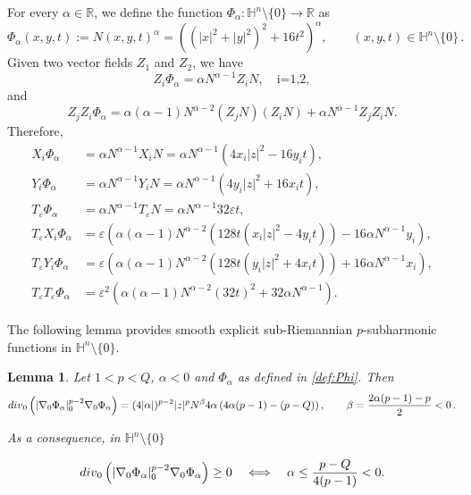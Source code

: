 \documentclass[10pt]{amsart}
\numberwithin{equation}{section}
\newtheorem{lemma}[theorem]{Lemma}
\theoremstyle{definition}
\newcommand{\R}{{\mathbb R}}
\newcommand{\eps}{\varepsilon}
\newcommand{\He}{\mathbb{H}}
\newcommand{\eT}{T_{\eps}}
\begin{document}
For every $\alpha \in \R$, we define the function $\Phi_{\alpha}:\He^n\setminus \{ 0\} \to \R$ as
\begin{equation}\label{def:Phi}
\Phi_{\alpha}(x,y,t):= N(x,y,t)^{\alpha} = \left((|x|^2 + |y|^2)^2 + 16t^2\right)^{\alpha}, \qquad (x,y,t) \in \He^n\setminus \{ 0\} \,.
\end{equation}
Given two vector fields $Z_1$ and $Z_2$, we have 
$$Z_i \Phi_{\alpha} = \alpha N^{\alpha -1} Z_i N, \quad \mbox{i=1,2},$$
\noindent and
$$Z_j Z_i \Phi_{\alpha} = \alpha (\alpha-1)N^{\alpha-2}(Z_j N)(Z_i N) + \alpha N^{\alpha-1}Z_j Z_i N.$$ 
Therefore,
\begin{align}
\label{XiPhi} X_i \Phi_{\alpha} &= \alpha N^{\alpha -1} X_i N = \alpha N^{\alpha-1} (4x_i |z|^2 - 16y_i t),\\
\label{YiPhi} Y_i \Phi_{\alpha} &= \alpha N^{\alpha -1} Y_i N = \alpha N^{\alpha-1} (4y_i |z|^2 + 16x_i t),\\
\label{TPhi} \eT \Phi_{\alpha} &= \alpha N^{\alpha -1} \eT N = \alpha N^{\alpha-1} 32 \eps t,\\
\eT X_i \Phi_{\alpha} &= \eps \left( \alpha (\alpha-1) N^{\alpha-2}(128 t (x_i |z|^2- 4y_i t)) - 16 \alpha N^{\alpha-1}y_i \right),\\
\eT Y_i \Phi_{\alpha} &= \eps \left( \alpha (\alpha-1) N^{\alpha-2}(128 t (y_i |z|^2+ 4x_i t)) + 16 \alpha N^{\alpha-1}x_i \right),\\
\label{TTPhi} \eT \eT \Phi_{\alpha} &= \eps^2 \left( \alpha (\alpha-1)N^{\alpha-2} (32t)^2 + 32 \alpha N^{\alpha-1}\right).
\end{align}



\medskip

The following lemma provides smooth explicit sub-Riemannian $p$-subharmonic functions in $\He^n \setminus\{ 0\}$.
 
\begin{lemma}\label{p-Harm}
Let $1<p<Q$, $\alpha <0$ and $\Phi_\alpha$ as defined in \eqref{def:Phi}. Then
\begin{equation}
\label{plapPhialpha}
	{\rm div}_0\left(|\nabla_0 \Phi_{\alpha}|_0^{p-2}\nabla_0 \Phi_{\alpha} \right) = (4 |\alpha|)^{p-2}|z|^p N^{\beta} 4\alpha\left(4\alpha(p-1) -(p-Q)  \right), \qquad \beta = \dfrac{2\alpha(p-1)-p}{2}<0 \,.
\end{equation}

As a consequence, in $\mathbb{H}^n \setminus \{ 0\}$

$${\rm div}_0\left(|\nabla_0 \Phi_{\alpha}|_0^{p-2}\nabla_0 \Phi_{\alpha} \right) \geq 0
\quad \Longleftrightarrow  \quad \alpha \leq \dfrac{p-Q}{4(p-1)}<0 .$$
\end{lemma}
\end{document}
